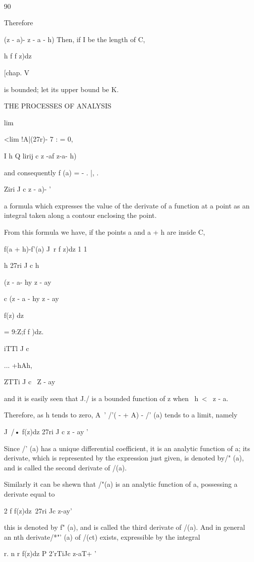 {{\

90

Therefore

(z - a)- z - a - h) Then, if I be the length of C,

h f f z)dz

[chap. V

is bounded; let its upper bound be K.

THE PROCESSES OF ANALYSIS

lim

<lim !A|(27r)- 7 : = 0,

I h Q lirij c z -af z-a- h)

and consequently f (a) = - . |, .

   Ziri J c z - a)- '

a formula which expresses the value of the derivate of a function at a
point as an integral taken along a contour enclosing the point.

From this formula we have, if the points a and a + h are inside C,

f(a + h)-f'(a) J\ r f z)dz 1 1

h 27ri J c h

(z - a- hy z - ay

c (z - a - hy z - ay

f(z) dz

= 9:Z;f f )dz.

iTTl J c

... +hAh,

ZTTi J c \ Z - ay

and it is easily seen that J./ is a bounded function of z when \ h\ <
\ z - a.

Therefore, as h tends to zero, A~' /'( - + A) - /' (a) tends to a
limit, namely

J\ /• f(z)dz 27ri J c z - ay '

Since /' (a) has a unique differential coefficient, it is an analytic
function of a; its derivate, which is represented by the expression
just given, is denoted by/" (a), and is called the second derivate of
/(a).

Similarly it can be shewn that /"(a) is an analytic function of a,
possessing a derivate equal to

2 f f(z)dz\ 27ri Jc z-ay'

this is denoted by f" (a), and is called the third derivate of /(a).
And in general an nth derivate/*"' (a) of /(ct) exists, expressible by
the integral

r. n r f(z)dz P 2'rTiJc z-aT+ '

}}
